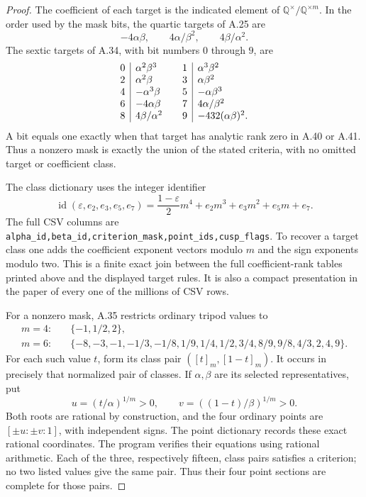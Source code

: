 \begin{proof}
The coefficient of each target is the indicated element of
$\mathbb Q^\times/\mathbb Q^{\times m}$. In the order used by the mask
bits, the quartic targets of A.25 are
\[
 -4\alpha\beta,\qquad
 4\alpha/\beta^2,\qquad
 4\beta/\alpha^2.
\]
The sextic targets of A.34, with bit numbers $0$ through $9$, are
\[
\begin{array}{c|l@{\qquad}c|l}
0&\alpha^2\beta^3&1&\alpha^3\beta^2\\
2&\alpha^2\beta&3&\alpha\beta^2\\
4&-\alpha^3\beta&5&-\alpha\beta^3\\
6&-4\alpha\beta&7&4\alpha/\beta^2\\
8&4\beta/\alpha^2&9&-432(\alpha\beta)^2.
\end{array}
\]
A bit equals one exactly when that target has analytic rank zero in
A.40 or A.41. Thus a nonzero mask is exactly the union of the stated
criteria, with no omitted target or coefficient class.

The class dictionary uses the integer identifier
\[
 \operatorname{id}(\varepsilon,e_2,e_3,e_5,e_7)
 =\frac{1-\varepsilon}{2}m^4+e_2m^3+e_3m^2+e_5m+e_7.
\]
The full CSV columns are
\texttt{alpha\_id,beta\_id,criterion\_mask,point\_ids,cusp\_flags}.
To recover a target class one adds the coefficient exponent vectors
modulo $m$ and the sign exponents modulo two. This is a finite exact join
between the full coefficient-rank tables printed above and the displayed
target rules. It is also a compact presentation in the paper of every
one of the millions of CSV rows.

For a nonzero mask, A.35 restricts ordinary tripod values to
\[
\begin{split}
m=4:\quad&\{-1,1/2,2\},\\
m=6:\quad&\{-8,-3,-1,-1/3,-1/8,1/9,1/4,1/2,3/4,8/9,
                 9/8,4/3,2,4,9\}.
\end{split}
\]
For each such value $t$, form its class pair
$([t]_m,[1-t]_m)$. It occurs in precisely that normalized pair of
classes. If $\alpha,\beta$ are its selected representatives, put
\[
 u=(t/\alpha)^{1/m}>0,\qquad
 v=((1-t)/\beta)^{1/m}>0.
\]
Both roots are rational by construction, and the four ordinary points are
$[\pm u:\pm v:1]$, with independent signs. The point dictionary records
these exact rational coordinates. The program verifies their equations
using rational arithmetic. Each of the three, respectively fifteen,
class pairs satisfies a criterion; no two listed values give the same
pair. Thus their four point sections are complete for those pairs.


\end{proof}
